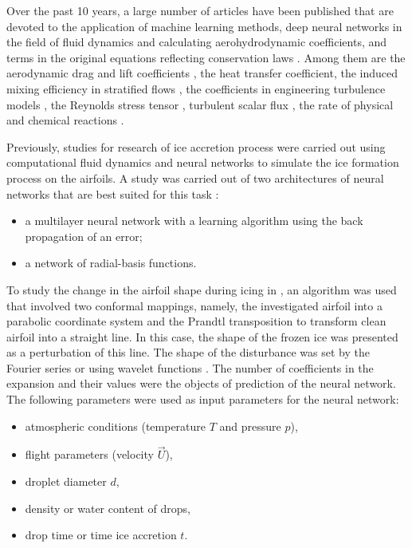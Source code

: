 \documentclass[aerospace,article,submit,moreauthors,pdftex]{Definitions/mdpi}
\begin{document}
Over the past 10 years, a large number of articles have been published that are devoted to the application of machine learning methods, deep neural networks in the field of fluid dynamics and calculating aerohydrodynamic coefficients, and terms in the original equations reflecting conservation laws \cite{DuraisamyIaccarinoXiao2019}. Among them are the aerodynamic drag and lift coefficients \cite{zhang2018application}, the heat transfer coefficient, the induced mixing efficiency in stratified flows 
\cite{SalehipourPeltier2019}, the coefficients in engineering turbulence models \cite{ParishDuraisamy2016}, the Reynolds stress tensor 
\cite{LingKurzawskiTempleton2016}, turbulent scalar flux 
\cite{MilaniLingEaton2020},  the rate of physical and chemical reactions \cite{Lapeyre2019}. 

Previously, studies for research of ice accretion process were carried out using computational fluid dynamics and neural networks to simulate the ice formation process on the airfoils. A study was carried out of two architectures of neural networks that are best suited for this task \cite{OgretimHuebschShinn2006}:
\begin{itemize}
    \item a multilayer neural network with a learning algorithm using the back propagation of an error;
    \item a network of radial-basis functions.
\end{itemize}

To study the change in the airfoil shape during icing in 
\cite{ChangLengWuThompson2016}, an algorithm was used that involved two conformal mappings, namely, the investigated airfoil into a parabolic coordinate system and the Prandtl transposition to transform clean airfoil into a straight line. In this case, the shape of the frozen ice was presented as a perturbation of this line. The shape of the disturbance was set by the Fourier series or using wavelet functions \cite{ChangLengWuThompson2016}. The number of coefficients in the expansion and their values were the objects of prediction of the neural network.
The following parameters were used as input parameters for the neural network: 
\begin{itemize}
    \item atmospheric conditions (temperature $T$ and pressure $p$), 
    \item flight parameters (velocity $\vec U$), 
    \item droplet diameter $d$, 
    \item density or water content of drops, 
    \item drop time or time ice accretion $t$.
\end{itemize}
\end{document}
